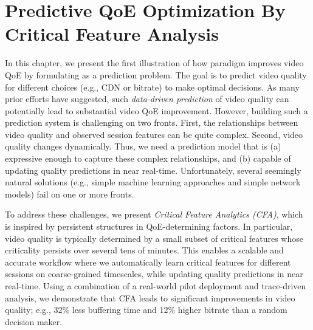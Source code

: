 \chapter{Predictive QoE Optimization By Critical Feature Analysis}
\label{ch:cfa}

\newcommand{\dda}{{CFA}\xspace}
\newcommand{\system}{{\dda}\xspace}
\newcommand{\ControlPlane}{{global optimization system}\xspace}

In this chapter, we present the first illustration of how \ddn paradigm 
improves video QoE by formulating \ddn as a prediction problem. The goal is 
to predict video quality  for different choices (e.g., CDN 
or bitrate) to make optimal decisions.
As many prior efforts have suggested, such  {\em data-driven prediction} of 
video quality can potentially lead to substantial video QoE improvement.
However, building such a prediction system is challenging on two fronts. 
First, the relationships between video quality and observed 
session features can be quite complex. Second, video quality changes 
dynamically. 
Thus, we need a prediction model that is 
(a) expressive enough to capture these complex relationships, 
and (b) capable of updating quality predictions in near 
real-time. 
Unfortunately, several seemingly natural solutions (e.g., 
simple machine learning approaches and simple network models) fail on 
one or more fronts.

To address these challenges, we present {\em Critical 
Feature Analytics (\dda)}, which is inspired by  persistent
structures in QoE-determining factors. 
In particular, video quality is typically determined by a small subset of 
critical features whose criticality persists over several tens of minutes.
This enables a scalable and accurate workflow where 
we automatically learn critical features for different 
sessions on coarse-grained timescales, while updating 
quality predictions in  near real-time. 
Using a  combination of a real-world pilot deployment 
and trace-driven analysis, we demonstrate that \dda 
leads to significant improvements in video quality; e.g., 32\% less 
buffering time and 12\% higher bitrate than a random decision maker.

